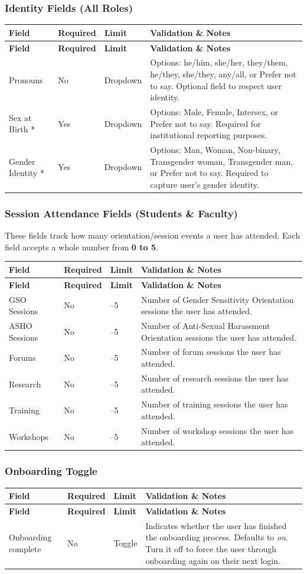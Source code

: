 \documentclass[12pt, a4paper]{article}
\newenvironment{fieldtable}{%
  \begin{longtable}{|>{\raggedright\arraybackslash}p{2.2cm}|>{\centering\arraybackslash}p{1.8cm}|>{\raggedright\arraybackslash}p{2.2cm}|>{\raggedright\arraybackslash}p{7.3cm}|}
  \hline
  \rowcolor{lightgray}
  \textbf{Field} & \textbf{Required} & \textbf{Limit} & \textbf{Validation \& Notes} \\
  \hline
  \endfirsthead
  \hline
  \rowcolor{lightgray}
  \textbf{Field} & \textbf{Required} & \textbf{Limit} & \textbf{Validation \& Notes} \\
  \hline
  \endhead
  \hline
  \endfoot
}{%
  \end{longtable}
}
\newcommand{\fieldrow}[4]{%
  #1 & #2 & #3 & #4 \\ \hline
}
\begin{document}
\subsubsection{Identity Fields (All Roles)}

\begin{fieldtable}
  \fieldrow{Pronouns}{No}{Dropdown}{Options: he/him, she/her, they/them, he/they, she/they, any/all, or Prefer not to say. Optional field to respect user identity.}
  \fieldrow{Sex at Birth *}{Yes}{Dropdown}{Options: Male, Female, Intersex, or Prefer not to say. Required for institutional reporting purposes.}
  \fieldrow{Gender Identity *}{Yes}{Dropdown}{Options: Man, Woman, Non-binary, Transgender woman, Transgender man, or Prefer not to say. Required to capture user's gender identity.}
\end{fieldtable}

\subsubsection{Session Attendance Fields (Students \& Faculty)}

These fields track how many orientation/session events a user has attended. Each field accepts a whole number from \textbf{0 to 5}.

\begin{fieldtable}
  \fieldrow{GSO Sessions}{No}{0--5}{Number of Gender Sensitivity Orientation sessions the user has attended.}
  \fieldrow{ASHO Sessions}{No}{0--5}{Number of Anti-Sexual Harassment Orientation sessions the user has attended.}
  \fieldrow{Forums}{No}{0--5}{Number of forum sessions the user has attended.}
  \fieldrow{Research}{No}{0--5}{Number of research sessions the user has attended.}
  \fieldrow{Training}{No}{0--5}{Number of training sessions the user has attended.}
  \fieldrow{Workshops}{No}{0--5}{Number of workshop sessions the user has attended.}
\end{fieldtable}

\subsubsection{Onboarding Toggle}

\begin{fieldtable}
  \fieldrow{Onboarding complete}{No}{Toggle}{Indicates whether the user has finished the onboarding process. Defaults to \textit{on}. Turn it off to force the user through onboarding again on their next login.}
\end{fieldtable}
\end{document}

